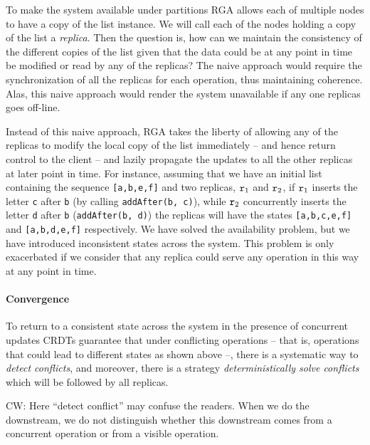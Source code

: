 To make the system available under partitions RGA allows each of
multiple nodes to have a copy of the list instance.
%
We will call each of the nodes holding a copy of the list a \emph{replica}.
%
Then the question is, how can we maintain the consistency of the
different copies of the list given that the data could be at any point
in time be modified or read by any of the replicas?
%
The naive approach would require the synchronization of all the
replicas for each operation, thus maintaining coherence.
%
Alas, this naive approach would render the system unavailable if any
one replicas goes off-line.
%

Instead of this naive approach, RGA takes the liberty of allowing any
of the replicas to modify the local copy of the list immediately --
and hence return control to the client -- and lazily propagate the
updates to all the other replicas at later point in time.
%
For instance, assuming that we have an initial list containing the
sequence \lstinline|[a,b,e,f]| and two replicas, $\mathtt{r}_1$ and
$\mathtt{r}_2$, if $\mathtt{r}_1$ inserts the letter \lstinline|c| after
\lstinline|b| (by calling \lstinline|addAfter(b, c)|), while $\mathtt{r}_2$
concurrently inserts the letter \lstinline|d| after \lstinline|b|
(\lstinline|addAfter(b, d)|) the replicas will have the states
\lstinline|[a,b,c,e,f]| and \lstinline|[a,b,d,e,f]|
respectively.
%
We have solved the availability problem, but we have introduced
inconsistent states across the system.
%
This problem is only exacerbated if we consider that any replica could
serve any operation in this way at any point in time.

\paragraph{Convergence}

To return to a consistent state across the system in the presence of
concurrent updates CRDTs guarantee that under conflicting operations --
that is, operations that could lead to different states as shown above
--, there is a systematic way to \emph{detect conflicts}, and moreover, there
is a strategy \emph{deterministically solve conflicts} which will be followed
by all replicas. 

{\color {red}CW: Here ``detect conflict'' may confuse the readers. When we do the downstream, we do not distinguish whether this downstream comes from a concurrent operation or from a visible operation.}

